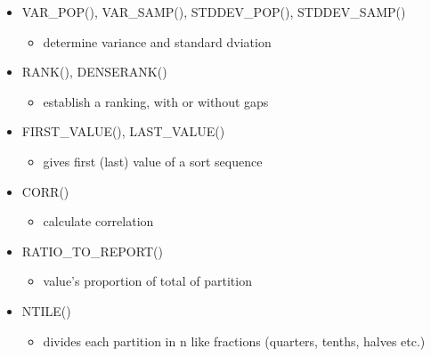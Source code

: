 \begin{breakbox}
\begin{itemize}
	\item VAR\_POP(), VAR\_SAMP(), STDDEV\_POP(), STDDEV\_SAMP()
	\begin{itemize}
		\item determine variance and standard dviation
	\end{itemize}
	\item RANK(), DENSERANK()
	\begin{itemize}
		\item establish a ranking, with or without gaps
	\end{itemize}
	\item FIRST\_VALUE(), LAST\_VALUE()
	\begin{itemize}
		\item gives first (last) value of a sort sequence
	\end{itemize}
	\item CORR()
	\begin{itemize}
		\item calculate correlation
	\end{itemize}
	\item RATIO\_TO\_REPORT()
	\begin{itemize}
		\item value's proportion of total of partition
	\end{itemize}
	\item NTILE()
	\begin{itemize}
		\item divides each partition in n like fractions (quarters, tenths, halves etc.)
	\end{itemize}
\end{itemize}	
\end{breakbox}

